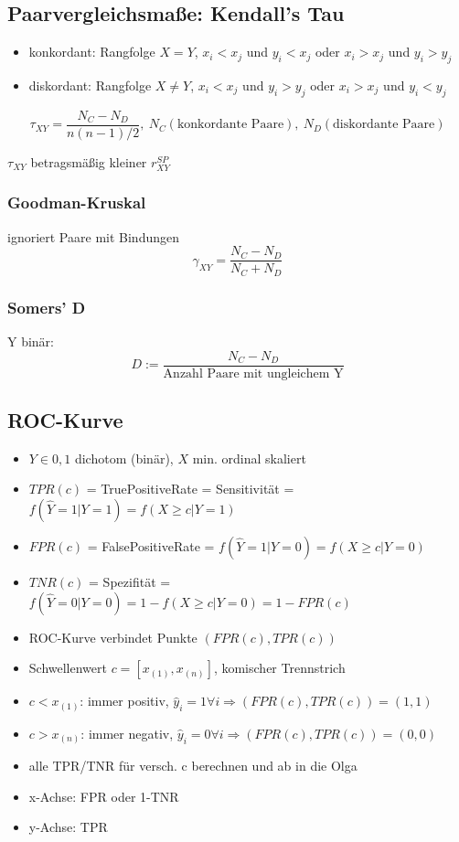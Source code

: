 \documentclass[10pt,a4paper,landscape]{article}
\begin{document}
\begin{multicols}{4}
\subsection{Paarvergleichsmaße: Kendall's Tau}
\begin{itemize}
\item konkordant: Rangfolge $X = Y$, $x_i < x_j$ und $y_i < x_j$ oder $x_i > x_j$ und $y_i > y_j$
\item diskordant: Rangfolge $X \neq Y$, $x_i < x_j$ und $y_i > y_j$ oder $x_i > x_j$ und $y_i < y_j$ 
\end{itemize}

\[
\tau_{XY}= \frac{N_C-N_D}{n(n-1)/2}, ~N_C(\text{konkordante Paare}), ~N_D(\text{diskordante Paare})
\]

$\tau_{XY}$ betragsmäßig kleiner $r_{XY}^{SP}$

\subsubsection{Goodman-Kruskal}
ignoriert Paare mit Bindungen
\[
\gamma_{XY}=\frac{N_C-N_D}{N_C+N_D}
\]

\subsubsection{Somers' D}
Y binär:
\[
D := \frac{N_C-N_D}{\text{Anzahl Paare mit ungleichem Y}}
\]

\subsection{ROC-Kurve}
\begin{itemize}
\item $Y \in {0,1}$ dichotom (binär), $X$ min. ordinal skaliert
\item $TPR(c)$ = TruePositiveRate = Sensitivität = $f(\hat{Y}=1|Y=1)=f(X\geq c|Y=1)$
\item $FPR(c)$ = FalsePositiveRate = $f(\hat{Y}=1|Y=0)=f(X\geq c|Y=0)$
\item $TNR(c)$ = Spezifität = $f(\hat{Y}=0|Y=0)=1-f(X\geq c|Y=0)=1-FPR(c)$
\item ROC-Kurve verbindet Punkte $(FPR(c), TPR(c))$
\item Schwellenwert $c = [x_{(1)}, x_{(n)}]$, komischer Trennstrich
\item $c<x_{(1)}$: immer positiv, $\hat{y}_i=1 \forall i \Rightarrow (FPR(c),TPR(c))=(1,1)$
\item $c>x_{(n)}$: immer negativ, $\hat{y}_i=0 \forall i \Rightarrow (FPR(c),TPR(c))=(0,0)$
\item alle TPR/TNR für versch. c berechnen und ab in die Olga
\item x-Achse: FPR oder 1-TNR
\item y-Achse: TPR
\end{itemize}


\end{multicols}
\end{document}
